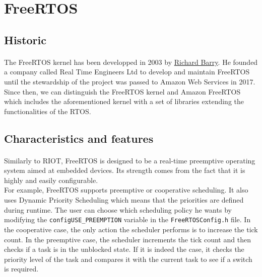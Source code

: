 \section{FreeRTOS}

\subsection{Historic}
\paragraph{}
The FreeRTOS kernel has been developped in 2003 by \href{https://www.linkedin.com/in/richard-barry-4562262/}{Richard Barry}. %
He founded a company called Real Time Engineers Ltd to develop and maintain FreeRTOS until the stewardship of the project was passed to Amazon Web Services in 2017.
Since then, we can distinguish the FreeRTOS kernel and Amazon FreeRTOS which includes the aforementioned kernel 
    with a set of libraries extending the functionalities of the RTOS.

\subsection{Characteristics and features}
\paragraph{}
Similarly to RIOT, FreeRTOS is designed to be a real-time preemptive operating system aimed at embedded devices.
Its strength comes from the fact that it is highly and easily configurable.\\

For example, FreeRTOS supports preemptive or cooperative scheduling. 
It also uses Dynamic Priority Scheduling which means that the priorities are defined during runtime.
The user can choose which scheduling policy he wants by modifying the \texttt{configUSE\_PREEMPTION} variable in the \texttt{FreeRTOSConfig.h} file.
In the cooperative case, the only action the scheduler performs is to increase the tick count.
In the preemptive case, the scheduler increments the tick count and then checks if a task is in the unblocked state.
If it is indeed the case, it checks the priority level of the task and compares it with the current task to see if a switch is required.\\

